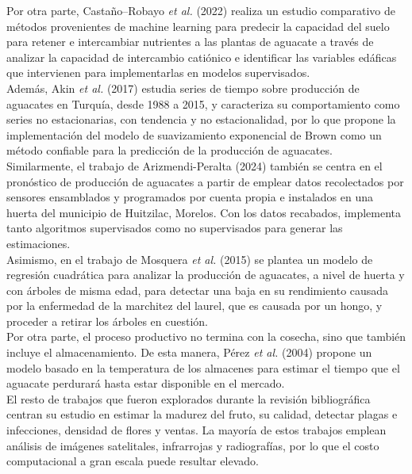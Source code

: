 Por otra parte, Castaño--Robayo \textit{et al.} (2022) \cite{Castaño_2022} realiza un estudio comparativo de métodos provenientes de machine learning para predecir la capacidad del suelo para retener e intercambiar nutrientes a las plantas de aguacate a través de analizar la capacidad de intercambio catiónico e identificar las variables edáficas que intervienen para implementarlas en modelos supervisados.\\ 


Además, Akin \textit{et al.} (2017) \cite{Akin_2017} estudia series de tiempo sobre producción de aguacates en Turquía, desde 1988 a 2015, y caracteriza su comportamiento como series no estacionarias, con tendencia y no estacionalidad, por lo que propone la implementación del modelo de suavizamiento exponencial de Brown como un método confiable para la predicción de la producción de aguacates.\\

Similarmente, el trabajo de Arizmendi-Peralta (2024) \cite{ARIZMENDIPERALTA2024} también se centra en el pronóstico de producción de aguacates a partir de emplear datos recolectados por sensores ensamblados y programados por cuenta propia e instalados en una huerta del municipio de Huitzilac, Morelos. Con los datos recabados, implementa tanto algoritmos supervisados como no supervisados para generar las estimaciones.\\

Asimismo, en el trabajo de Mosquera \textit{et al.} (2015) \cite{Mosquera_2015} se plantea un modelo de regresión cuadrática para analizar la producción de aguacates, a nivel de huerta y con árboles de misma edad, para detectar una baja en su rendimiento causada por la enfermedad de la marchitez del laurel, que es causada por un hongo, y proceder a retirar los árboles en cuestión.\\

Por otra parte, el proceso productivo no termina con la cosecha, sino que también incluye el almacenamiento. De esta manera, Pérez \textit{et al.} (2004) \cite{Perez_2004} propone un modelo basado en la temperatura de los almacenes para estimar el tiempo que el aguacate perdurará hasta estar disponible en el mercado.\\

El resto de trabajos que fueron explorados durante la revisión bibliográfica centran su estudio en estimar la madurez del fruto, su calidad, detectar plagas e infecciones, densidad de flores y ventas. La mayoría de estos trabajos emplean análisis de imágenes satelitales, infrarrojas y radiografías, por lo que el costo computacional a gran escala puede resultar elevado. \\


